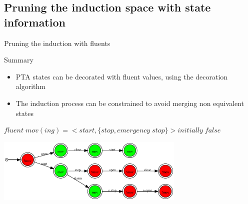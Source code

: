 \subsection{Pruning the induction space with state information}
\begin{frame}{Pruning the induction with fluents}
	\begin{block}{Summary}
		\begin{itemize}
			\item PTA states can be decorated with fluent values, using the decoration algorithm
			\item The induction process can be constrained to avoid merging non equivalent states
		\end{itemize}
	\end{block}
	\begin{center}
		$fluent\;mov(ing) = <start, \{stop, emergency\;stop\}> initially\;false$
	\end{center}
	\begin{center}
		\includegraphics[width=9cm]{images/train_pta.pdf}
	\end{center}
\end{frame}

